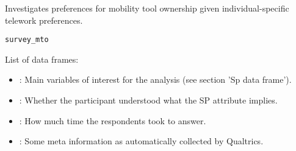 %
\begin{Description}
Investigates preferences for mobility tool ownership given individual-specific
telework preferences.
\end{Description}
%
\begin{Usage}
\begin{verbatim}
survey_mto
\end{verbatim}
\end{Usage}
%
\begin{Format}
List of data frames:
\begin{itemize}

\item{} : Main variables of interest for the analysis (see section 'Sp data frame').
\item{} : Whether the participant understood what the SP attribute implies.
\item{} : How much time the respondents took to answer.
\item{} : Some meta information as automatically collected by Qualtrics.

\end{itemize}

\end{Format}
%
